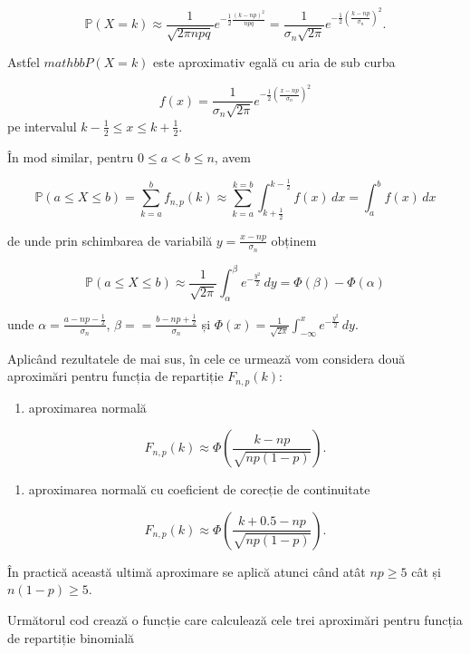 \documentclass[]{article}
\providecommand{\tightlist}{%
  \setlength{\itemsep}{0pt}\setlength{\parskip}{0pt}}
\begin{document}
\[
  \mathbb{P}(X=k)\approx \frac{1}{\sqrt{2\pi npq}}e^{-\frac{1}{2}\frac{(k-np)^2}{npq}} = \frac{1}{\sigma_n\sqrt{2\pi}}e^{-\frac{1}{2}\left(\frac{k-np}{\sigma_n}\right)^2}.
\]

Astfel \(mathbb{P}(X=k)\) este aproximativ egală cu aria de sub curba

\[
  f(x) = \frac{1}{\sigma_n\sqrt{2\pi}}e^{-\frac{1}{2}\left(\frac{x-np}{\sigma_n}\right)^2}
\] pe intervalul \(k-\frac{1}{2}\leq x\leq k+\frac{1}{2}\).

În mod similar, pentru \(0\leq a< b\leq n\), avem

\[
  \mathbb{P}(a\leq X\leq b) = \sum_{k=a}^{b}f_{n,p}(k) \approx \sum_{k=a}^{k=b}\int_{k+\frac{1}{2}}^{k-\frac{1}{2}}f(x)\,dx = \int_{a}^{b}f(x)\,dx
\]

de unde prin schimbarea de variabilă \(y = \frac{x-np}{\sigma_n}\)
obținem

\[
  \mathbb{P}(a\leq X\leq b)\approx \frac{1}{\sqrt{2\pi}}\int_{\alpha}^{\beta}e^{-\frac{y^2}{2}}\,dy = \Phi(\beta) - \Phi(\alpha)
\]

unde \(\alpha = \frac{a-np-\frac{1}{2}}{\sigma_n}\),
\(\beta = = \frac{b-np+\frac{1}{2}}{\sigma_n}\) și
\(\Phi(x)=\frac{1}{\sqrt{2\pi}}\int_{-\infty}^{x}e^{-\frac{y^2}{2}}\,dy\).

Aplicând rezultatele de mai sus, în cele ce urmează vom considera două
aproximări pentru funcția de repartiție \(F_{n,p}(k)\):

\begin{enumerate}
\def\labelenumi{\alph{enumi})}
\tightlist
\item
  aproximarea normală
\end{enumerate}

\[
F_{n,p}(k) \approx \Phi\left(\frac{k-np}{\sqrt{np(1-p)}}\right).
\]

\begin{enumerate}
\def\labelenumi{\alph{enumi})}
\setcounter{enumi}{1}
\tightlist
\item
  aproximarea normală cu coeficient de corecție de continuitate
\end{enumerate}

\[
F_{n,p}(k) \approx \Phi\left(\frac{k+0.5-np}{\sqrt{np(1-p)}}\right).
\]

În practică această ultimă aproximare se aplică atunci când atât
\(np\geq 5\) cât și \(n(1-p)\geq 5\).

Următorul cod crează o funcție care calculează cele trei aproximări
pentru funcția de repartiție binomială
\end{document}
